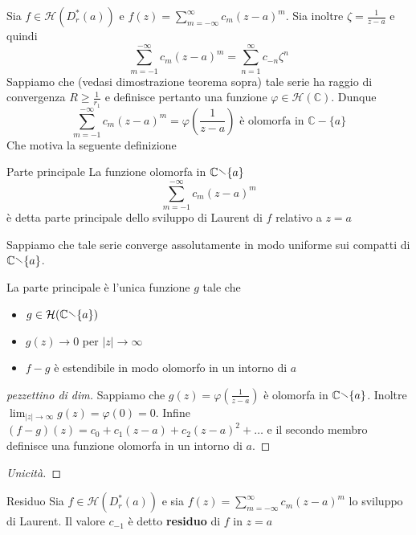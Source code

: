 Sia \(f \in \mathcal{H}{(D^{*}_{r} {(a)})}\) e \(f{(z)} =
\sum_{m=-\infty}^{\infty} c_{m} {(z-a)}^{m} \). Sia inoltre \(\zeta =
\frac{1}{z-a}\) e quindi
\[
    \sum_{m=-1}^{-\infty} c_{m} {(z-a)}^{m} = \sum_{n=1}^{\infty} c_{-n}
    \zeta^{n}
\]
Sappiamo che (vedasi dimostrazione teorema sopra) tale serie ha raggio di
convergenza \(R \ge  \frac{1}{r_{1}}\) e definisce pertanto una funzione
\(\varphi \in \mathcal{H}{(\mathbb{C})}\). Dunque
\[
    \sum_{m=-1}^{-\infty} c_{m} {(z-a)}^{m} = \varphi {\left( \frac{1}{z-a}
    \right)} \text{ è olomorfa in \(\mathbb{C} - \{a\}\)} 
\]
Che motiva la seguente definizione
\begin{definition}{Parte principale}
    La funzione olomorfa in \(\mathbb{C} \sminus  \{a\} \) 
\[
    \sum_{m=-1}^{-\infty} c_{m} {(z-a)}^{m} 
\]
    è detta parte principale dello sviluppo di Laurent di \(f\) relativo a \(z=a\) 
\end{definition}
Sappiamo che tale serie converge assolutamente in modo uniforme sui compatti di
\(\mathbb{C} \sminus \{a\} \). 

\begin{proposition}
    La parte principale è l'unica funzione \(g\) tale che
\begin{itemize}
    \item \(g \in \mathcal{H}{(\mathbb{C} \sminus \{a\} )}\) 
    \item \(g{(z)} \to 0\) per \(|z| \to \infty\) 
    \item \(f-g\) è estendibile in modo olomorfo in un intorno di \(a\) 
\end{itemize}
\end{proposition}
\begin{proof}[pezzettino di dim]
    Sappiamo che \(g{(z)} = \varphi {\left( \frac{1}{z-a} \right)} \) è olomorfa
    in \(\mathbb{C} \sminus \{a\} \). Inoltre \(\lim_{|z|\to \infty} g{(z)} =
    \varphi {(0)} = 0\). Infine \((f-g){(z)} = c_{0}+c_{1}{(z-a)} +
    c_{2}{(z-a)}^2 + \dots\) e il secondo membro definisce una funzione olomorfa
    in un intorno di \(a\).
\end{proof}
\begin{proof}[Unicità]
\end{proof}
\begin{definition}{Residuo}
    Sia \(f \in \mathcal{H}{(D^{*}_r{(a)})}\) e sia \(f{(z)} =
    \sum_{m=-\infty}^{\infty} c_{m} {(z-a)}^{m}\) lo sviluppo di Laurent. Il
    valore \(c_{-1} \) è detto \textbf{residuo} di \(f\)  in \(z=a\) 
\end{definition}

